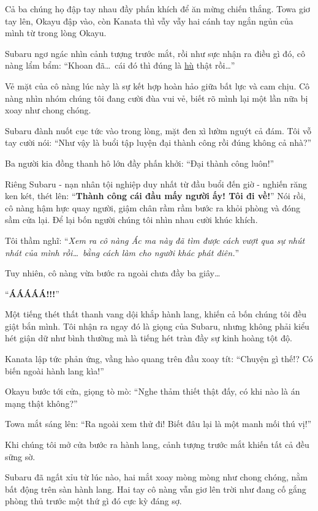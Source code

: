 \documentclass[../main.tex]{subfiles}
\begin{document}
Cả ba chúng họ đập tay nhau đầy phấn khích để ăn mừng chiến thắng. Towa giơ tay lên, Okayu đập vào, còn Kanata thì vẫy vẫy hai cánh tay ngắn ngủn của mình từ trong lòng Okayu.

Subaru ngơ ngác nhìn cảnh tượng trước mắt, rồi như sực nhận ra điều gì đó, cô nàng lẩm bẩm: ``Khoan đã\dots\ cái đó thì đúng là \uline{hù} thật rồi\dots''

Vẻ mặt của cô nàng lúc này là sự kết hợp hoàn hảo giữa bất lực và cam chịu. Cô nàng nhìn nhóm chúng tôi đang cười đùa vui vẻ, biết rõ mình lại một lần nữa bị xoay như chong chóng.

Subaru đành nuốt cục tức vào trong lòng, mặt đen xì lườm nguýt cả đám. Tôi vỗ tay cười nói: ``Như vậy là buổi tập luyện đại thành công rồi đúng không cả nhà?''

Ba người kia đồng thanh hô lớn đầy phấn khởi: ``Đại thành công luôn!''

Riêng Subaru - nạn nhân tội nghiệp duy nhất từ đầu buổi đến giờ - nghiến răng ken két, thét lên: ``\textbf{Thành công cái đầu mấy người ấy! Tôi đi về!}'' Nói rồi, cô nàng hậm hực quay người, giậm chân rầm rầm bước ra khỏi phòng và đóng sầm cửa lại. Để lại bốn người chúng tôi nhìn nhau cười khúc khích.

Tôi thầm nghĩ: ``\textit{Xem ra cô nàng Ác ma này đã tìm được cách vượt qua sự nhút nhát của mình rồi\dots\ bằng cách làm cho người khác phát điên.}''

Tuy nhiên, cô nàng vừa bước ra ngoài chưa đầy ba giây\dots

``\textbf{ÁÁÁÁÁ!!!}''

Một tiếng thét thất thanh vang dội khắp hành lang, khiến cả bốn chúng tôi đều giật bắn mình. Tôi nhận ra ngay đó là giọng của Subaru, nhưng không phải kiểu hét giận dữ như bình thường mà là tiếng hét tràn đầy sự kinh hoàng tột độ.

Kanata lập tức phản ứng, vầng hào quang trên đầu xoay tít: ``Chuyện gì thế!? Có biến ngoài hành lang kìa!''

Okayu bước tới cửa, giọng tò mò: ``Nghe thảm thiết thật đấy, có khi nào là án mạng thật không?''

Towa mắt sáng lên: ``Ra ngoài xem thử đi! Biết đâu lại là một manh mối thú vị!''

Khi chúng tôi mở cửa bước ra hành lang, cảnh tượng trước mắt khiến tất cả đều sững sờ.

Subaru đã ngất xỉu từ lúc nào, hai mắt xoay mòng mòng như chong chóng, nằm bất động trên sàn hành lang. Hai tay cô nàng vẫn giơ lên trời như đang cố gắng phòng thủ trước một thứ gì đó cực kỳ đáng sợ.
\end{document}
